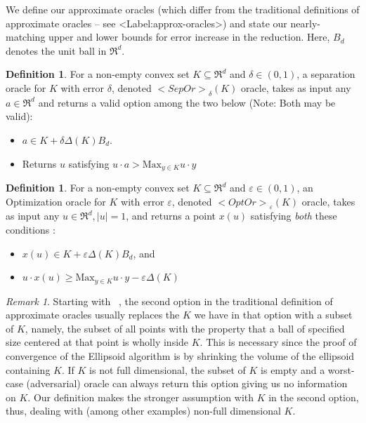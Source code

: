 \documentclass[11pt,letterpaper]{article}
\newcounter{note}[section]
\def\mathsf#1{<#1>}%
\def\Cref#1{<Label:#1>}%
\theoremstyle{definition}
\newtheorem{defn}[theorem]{Definition}
\theoremstyle{remark}
\newtheorem{remark}[theorem]{Remark}
\newcommand{\sep}{{\mathsf{SepOr}}}
\newcommand{\opto}{{\mathsf{OptOr}}}
\begin{document}
We define our approximate oracles (which differ from the traditional definitions of approximate oracles --  see \Cref{approx-oracles}) and state our nearly-matching upper and lower bounds for error increase in the reduction. Here, $B_d$ denotes the unit ball in $\Re^d$. 

\begin{defn}\label{defn-Sep}
For a non-empty convex set $K\subseteq\Re^d$ and $\delta\in (0,1)$, a separation oracle for $K$ with error $\delta$, denoted $\sep_\delta(K)$ oracle,  takes as input any $a\in \Re^d$ and returns a valid option among the two below (Note: Both may be valid):
\begin{itemize}
\item $a\in K+\delta \Delta (K) B_d$.
\item Returns $u$ satisfying
$u\cdot a >\mbox{Max}_{y\in K}u\cdot y$
\end{itemize} 
\end{defn}

\begin{defn}\label{olp}
For a non-empty convex set $K\subseteq \Re^d$ and $\varepsilon\in (0,1)$, an Optimization oracle for $K$ with error $\varepsilon$, denoted $\opto_\varepsilon(K)$ oracle,  takes as input any $u\in \Re^d, |u|=1$, and returns a point $x(u)$ satisfying {\em both} these conditions :
\begin{itemize}
\item $x(u)\in K+\varepsilon\Delta(K)B_d$, and
\item $u\cdot x(u)\geq \mbox{Max}_{y\in K}u\cdot y-\varepsilon\Delta(K)$
\end{itemize}
\end{defn}

\begin{remark}\label{approx-oracles}
Starting with ~\cite{GLS1988}, the second option in the traditional definition of approximate oracles usually replaces the $K$ we have in that option with a subset of $K$, namely, the subset of all points with the property that a ball of specified size centered at that point is wholly inside $K$. This is necessary since the proof of convergence of the Ellipsoid algorithm is by shrinking the volume of the ellipsoid containing $K$.
If $K$ is not full dimensional, the subset of $K$ is empty and a worst-case (adversarial) oracle can always return this option giving us no information on $K$. Our definition makes the stronger assumption  with $K$ in the second option, thus, dealing with (among other examples) non-full dimensional $K$.
\end{remark}
\end{document}
